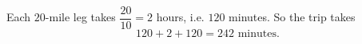 Each $20$-mile leg takes $\dfrac{20}{10}=2$ hours, i.e. $120$ minutes. So the trip takes
\[120+2+120=\boxed{242}\text{ minutes}.\]
